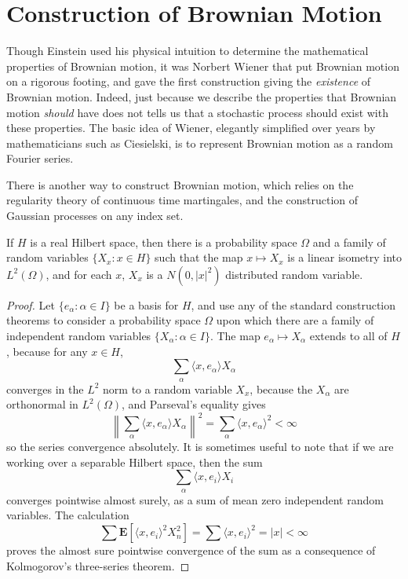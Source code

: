 \section{Construction of Brownian Motion}

Though Einstein used his physical intuition to determine the mathematical properties of Brownian motion, it was Norbert Wiener that put Brownian motion on a rigorous footing, and gave the first construction giving the {\it existence} of Brownian motion. Indeed, just because we describe the properties that Brownian motion {\it should} have does not tells us that a stochastic process should exist with these properties. The basic idea of Wiener, elegantly simplified over years by mathematicians such as Ciesielski, is to represent Brownian motion as a random Fourier series.

There is another way to construct Brownian motion, which relies on the regularity theory of continuous time martingales, and the construction of Gaussian processes on any index set.

\begin{lemma}
    If $H$ is a real Hilbert space, then there is a probability space $\Omega$ and a family of random variables $\{ X_x : x \in H \}$ such that the map $x \mapsto X_x$ is a linear isometry into $L^2(\Omega)$, and for each $x$, $X_x$ is a $N(0, |x|^2)$ distributed random variable.
\end{lemma}
\begin{proof}
    Let $\{ e_\alpha : \alpha \in I \}$ be a basis for $H$, and use any of the standard construction theorems to consider a probability space $\Omega$ upon which there are a family of independent random variables $\{ X_\alpha: \alpha \in I \}$. The map $e_\alpha \mapsto X_\alpha$ extends to all of $H$, because for any $x \in H$,
    \[ \sum_\alpha \langle x, e_\alpha \rangle X_\alpha \]
    converges in the $L^2$ norm to a random variable $X_x$, because the $X_\alpha$ are orthonormal in $L^2(\Omega)$, and Parseval's equality gives
    \[ \left\| \sum_\alpha \langle x, e_\alpha \rangle X_\alpha \right\|^2 = \sum_\alpha \langle x, e_\alpha \rangle^2 < \infty \]
    so the series convergence absolutely. It is sometimes useful to note that if we are working over a separable Hilbert space, then the sum
    \[ \sum_\alpha \langle x, e_i \rangle X_i \]
    converges pointwise almost surely, as a sum of mean zero independent random variables. The calculation
    \[ \sum \mathbf{E}[\langle x, e_i \rangle^2 X_n^2] = \sum \langle x, e_i \rangle^2 = |x| < \infty \]
    proves the almost sure pointwise convergence of the sum as a consequence of Kolmogorov's three-series theorem.
\end{proof}

